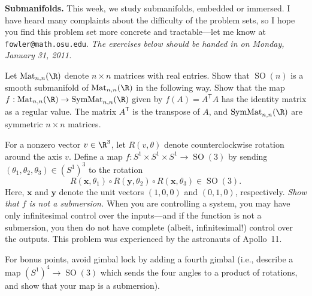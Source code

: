 \documentclass[12pt]{pset}
\author{Jim Fowler}
\date{Winter 2011}
\DeclareMathOperator{\SO}{SO}
\DeclareMathOperator{\Mat}{Mat}
\DeclareMathOperator{\SymMat}{SymMat}
\begin{document}
\maketitle

\noindent\textbf{Submanifolds.}  This week, we study submanifolds,
embedded or immersed.  I have heard many complaints about the
difficulty of the problem sets, so I hope you find this problem set
more concrete and tractable---let me know at
\texttt{fowler@math.osu.edu}.  \textit{The exercises below should be
  handed in on Monday, January 31, 2011.}

\begin{problem}
  
  Let $\Mat_{n,n}(\R)$ denote $n \times n$ matrices with real entries.
  Show that $\SO(n)$ is a smooth submanifold of $\Mat_{n,n}(\R)$ in
  the following way.  Show that the map $f : \Mat_{n,n}(\R) \to
  \SymMat_{n,n}(\R)$ given by $f(A) = A^{\textsf{T}} A$ has the
  identity matrix as a regular value.  The matrix $A^{\textsf{T}}$ is
  the transpose of $A$, and $\SymMat_{n,n}(\R)$ are symmetric $n
  \times n$ matrices.

\end{problem}

\vfill

\begin{problem}

  For a nonzero vector $v \in \R^3$, let $R(v,\theta)$ denote
  counterclockwise rotation around the axis $v$.  Define a map $f :
  S^1 \times S^1 \times S^1 \to \SO(3)$ by sending
  $(\theta_1,\theta_2,\theta_3) \in (S^1)^3$ to the rotation
  $$
  R(\textbf{x},\theta_1) \circ R(\textbf{y},\theta_2) \circ R(\textbf{x},\theta_3) \in \SO(3).
  $$
  Here, $\textbf{x}$ and $\textbf{y}$ denote the unit vectors
  $(1,0,0)$ and $(0,1,0)$, respectively.  \textit{Show that $f$ is not
    a submersion.}  When you are controlling a system, you may have
  only infinitesimal control over the inputs---and if the function is
  not a submersion, you then do not have complete (albeit,
  infinitesimal!) control over the outputs.  This problem was
  experienced by the astronauts of Apollo~11.
  
  For bonus points, avoid gimbal lock by adding a fourth gimbal (i.e.,
  describe a map $(S^1)^4 \to \SO(3)$ which sends the four angles to a
  product of rotations, and show that your map is a submersion).

\end{problem}
\end{document}
